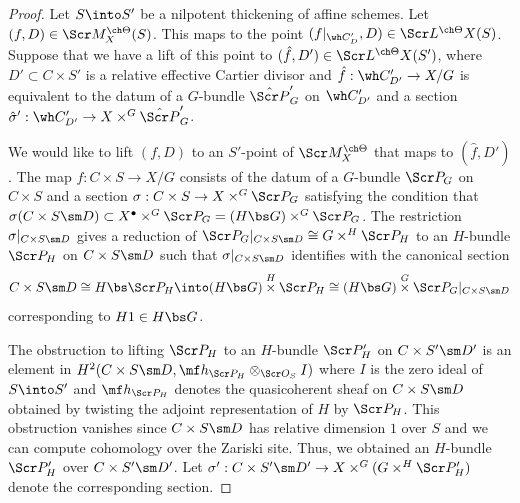 \begin{proof}
Let $S \into S'$ be a nilpotent thickening of affine schemes.
Let $(f,D) \in \Scr M_X^{\ch\Theta}(S)$.
This maps to the point $(f|_{\wh C'_D}, D) \in \Scr L^{\ch\Theta} X(S)$.
Suppose that we have a lift of this point to
$(\hat f, D') \in \Scr L^{\ch\Theta} X(S')$, where
$D'\subset C\times S'$ is a relative effective Cartier divisor
and $\hat f: \wh C'_{D'} \to X/G$ is equivalent to
the datum of a $G$-bundle $\hat{\Scr P}'_G$ on $\wh C'_{D'}$
and a section $\hat \sigma' : \wh C'_{D'} \to X \times^G \hat{\Scr P}'_G$.

We would like to lift $(f,D)$ to an $S'$-point of $\Scr M_X^{\ch\Theta}$
that maps to $(\hat f,D')$.
The map $f : C\times S \to X/G$
consists of the datum of a $G$-bundle $\Scr P_G$ on $C\times S$
and a section $\sigma : C\times S \to X \times^G \Scr P_G$
satisfying the condition that $\sigma(C\times S \sm D) \subset X^\bullet \times^G \Scr P_G = (H\bs G)\times^G \Scr P_G$.
The restriction $\sigma|_{C \times S \sm D}$
gives a reduction of $\Scr P_G|_{C\times S\sm D} \cong G\times^H \Scr P_H$ to an
$H$-bundle $\Scr P_H$ on $C\times S \sm D$ such that
$\sigma|_{C\times S\sm D}$ identifies with
the canonical section
\[ C\times S \sm D \cong H\bs \Scr P_H \into (H\bs G)\overset H\times \Scr P_H \cong (H\bs G) \overset G\times \Scr P_G|_{C\times S \sm D}\]
corresponding to $H1\in H\bs G$.

The obstruction to lifting $\Scr P_H$ to an $H$-bundle $\Scr P'_H$ on $C\times S' \sm D'$ is an element in $H^2(C\times S\sm D, \mf h_{\Scr P_H} \otimes_{\Scr O_S} I)$ where $I$
is the zero ideal of $S\into S'$ and $\mf h_{\Scr P_H}$ denotes the quasicoherent sheaf on $C\times S \sm D$ obtained
by twisting the adjoint representation of $H$ by $\Scr P_H$.
This obstruction vanishes since $C\times S \sm D$ has
relative dimension $1$ over $S$ and we can compute
cohomology over the Zariski site.
Thus, we obtained an $H$-bundle $\Scr P'_H$ over $C\times S' \sm D'$.
Let $\sigma' : C\times S'\sm D' \to X \times^G (G\times^H\Scr P'_H)$ denote the corresponding section.


\end{proof}
